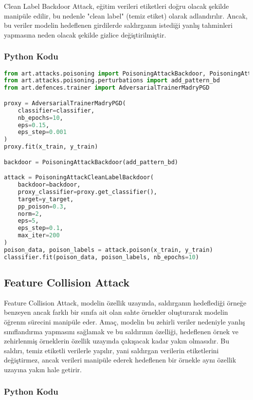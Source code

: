 Clean Label Backdoor Attack, eğitim verileri etiketleri doğru olacak şekilde manipüle edilir, bu nedenle "clean label" (temiz etiket) olarak adlandırılır. Ancak, bu veriler modelin hedeflenen girdilerde saldırganın istediği yanlış tahminleri yapmasına neden olacak şekilde gizlice değiştirilmiştir. 

\subsubsection{Python Kodu}

\begin{lstlisting}[language=Python]
from art.attacks.poisoning import PoisoningAttackBackdoor, PoisoningAttackCleanLabelBackdoor
from art.attacks.poisoning.perturbations import add_pattern_bd
from art.defences.trainer import AdversarialTrainerMadryPGD

proxy = AdversarialTrainerMadryPGD(
    classifier=classifier,
    nb_epochs=10,
    eps=0.15,
    eps_step=0.001
)
proxy.fit(x_train, y_train)

backdoor = PoisoningAttackBackdoor(add_pattern_bd)

attack = PoisoningAttackCleanLabelBackdoor(
    backdoor=backdoor,
    proxy_classifier=proxy.get_classifier(),
    target=y_target,
    pp_poison=0.3,
    norm=2,
    eps=5,
    eps_step=0.1,
    max_iter=200
)
poison_data, poison_labels = attack.poison(x_train, y_train)
classifier.fit(poison_data, poison_labels, nb_epochs=10)
\end{lstlisting}

\newpage

\subsection{Feature Collision Attack}

Feature Collision Attack, modelin özellik uzayında, saldırganın hedeflediği örneğe benzeyen ancak farklı bir sınıfa ait olan sahte örnekler oluşturarak modelin öğrenm sürecini manipüle eder. Amaç, modelin bu zehirli veriler nedeniyle yanlış sınıflandırma yapmasını sağlamak ve bu saldırının özelliği, hedeflenen örnek ve zehirlenmiş örneklerin özellik uzayında çakışacak kadar yakın olmasıdır. Bu saldırı, temiz etiketli verilerle yapılır, yani saldırgan verilerin etiketlerini değiştirmez, ancak verileri manipüle ederek hedeflenen bir örnekle aynı özellik uzayına yakın hale getirir.

\subsubsection{Python Kodu}

